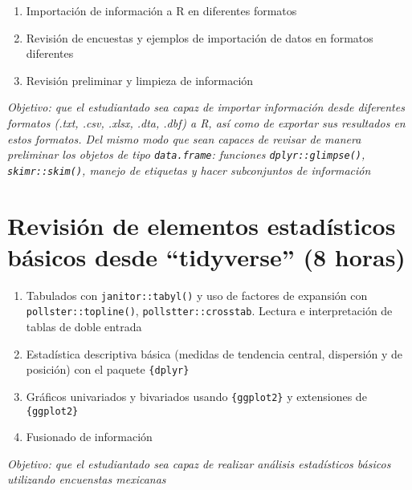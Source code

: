 \documentclass[
  letterpaper,
  DIV=11,
  numbers=noendperiod]{scrreprt}
\begin{document}
\begin{enumerate}
\def\labelenumi{\alph{enumi}.}
\item
  Importación de información a R en diferentes formatos
\item
  Revisión de encuestas y ejemplos de importación de datos en formatos
  diferentes
\item
  Revisión preliminar y limpieza de información
\end{enumerate}

\emph{Objetivo: que el estudiantado sea capaz de importar información
desde diferentes formatos (.txt, .csv, .xlsx, .dta, .dbf) a R, así como
de exportar sus resultados en estos formatos. Del mismo modo que sean
capaces de revisar de manera preliminar los objetos de tipo
\texttt{data.frame}: funciones \texttt{dplyr::glimpse()},
\texttt{skimr::skim()}, manejo de etiquetas y hacer subconjuntos de
información}

\hypertarget{revisiuxf3n-de-elementos-estaduxedsticos-buxe1sicos-desde-tidyverse-8-horas}{%
\section*{Revisión de elementos estadísticos básicos desde ``tidyverse''
(8
horas)}\label{revisiuxf3n-de-elementos-estaduxedsticos-buxe1sicos-desde-tidyverse-8-horas}}


\begin{enumerate}
\def\labelenumi{\alph{enumi}.}
\item
  Tabulados con \texttt{janitor::tabyl()} y uso de factores de expansión
  con \texttt{pollster::topline()}, \texttt{pollstter::crosstab}.
  Lectura e interpretación de tablas de doble entrada
\item
  Estadística descriptiva básica (medidas de tendencia central,
  dispersión y de posición) con el paquete \texttt{\{dplyr\}}
\item
  Gráficos univariados y bivariados usando \texttt{\{ggplot2\}} y
  extensiones de \texttt{\{ggplot2\}}
\item
  Fusionado de información
\end{enumerate}

\emph{Objetivo: que el estudiantado sea capaz de realizar análisis
estadísticos básicos utilizando encuenstas mexicanas}
\end{document}
